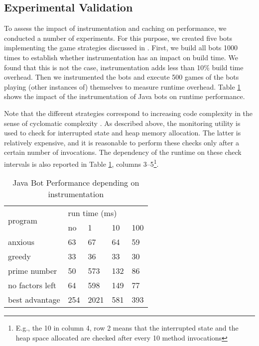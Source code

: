 \subsection{Experimental Validation}

To assess the impact of instrumentation and caching on performance, we conducted a number of experiments.  For this purpose, we created five bots implementing the game strategies 
discussed in \cite{meyer2010primegame}. First, we build all bots 1000 times to establish whether instrumentation has an impact on build time. We found that this is not the case, instrumentation adds less than 10\% build time overhead. Then we instrumented the bots and execute 500 games of the bots playing (other instances of) themselves to measure runtime overhead.
Table \ref{tab:performance:java} shows the impact of the instrumentation of Java bots on runtime performance.

Note that the different strategies correspond to increasing code complexity in the sense of cyclomatic complexity \cite{mccabe1976complexity}. As described above, the monitoring utility is used to check for interrupted state and heap memory allocation. The latter is relatively expensive, and it is reasonable to perform these checks only after a certain number of invocations. The dependency of the runtime on these check intervals is also reported in Table \ref{tab:performance:java}, columns 3--5\footnote{E.g., the 10 in column 4, row 2 means that the interrupted state and the heap space allocated are checked after every 10 method invocations}.


\begin{table}[h]
	\centering
	\caption{Java Bot Performance depending on instrumentation}
	\label{tab:performance:java}
	\begin{tabular}{|l|l|l|l|l|}
		\hline
		\multirow{2}{*}{program}  & \multicolumn{4}{l|}{run time (ms)} \\ \cline{2-5} 
					             & no   & 1    & 10    &  100    \\ \hline
		anxious                  & 63   & 67   & 64    & 59           \\ \hline
		greedy                   & 33   & 36   & 33    & 30           \\ \hline
		prime number             & 50   & 573  & 132   & 86           \\ \hline
		no factors left          & 64   & 598  & 149   & 77           \\ \hline
		best advantage           & 254  & 2021 & 581   & 393          \\ \hline
	\end{tabular}
\end{table}


